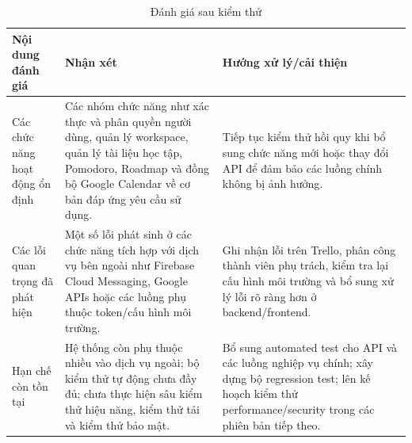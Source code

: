 \begin{table}[H]
\centering
\caption{Đánh giá sau kiểm thử}
\label{tab:post-test-evaluation}
\small
\begin{tabular}{|L{0.16\textwidth}|L{0.40\textwidth}|L{0.32\textwidth}|}
\hline
\textbf{Nội dung đánh giá} & \textbf{Nhận xét} & \textbf{Hướng xử lý/cải thiện} \\
\hline
Các chức năng hoạt động ổn định & Các nhóm chức năng như xác thực và phân quyền người dùng, quản lý workspace, quản lý tài liệu học tập, Pomodoro, Roadmap và đồng bộ Google Calendar về cơ bản đáp ứng yêu cầu sử dụng. & Tiếp tục kiểm thử hồi quy khi bổ sung chức năng mới hoặc thay đổi API để đảm bảo các luồng chính không bị ảnh hưởng. \\
\hline
Các lỗi quan trọng đã phát hiện & Một số lỗi phát sinh ở các chức năng tích hợp với dịch vụ bên ngoài như Firebase Cloud Messaging, Google APIs hoặc các luồng phụ thuộc token/cấu hình môi trường. & Ghi nhận lỗi trên Trello, phân công thành viên phụ trách, kiểm tra lại cấu hình môi trường và bổ sung xử lý lỗi rõ ràng hơn ở backend/frontend. \\
\hline
Hạn chế còn tồn tại & Hệ thống còn phụ thuộc nhiều vào dịch vụ ngoài; bộ kiểm thử tự động chưa đầy đủ; chưa thực hiện sâu kiểm thử hiệu năng, kiểm thử tải và kiểm thử bảo mật. & Bổ sung automated test cho API và các luồng nghiệp vụ chính; xây dựng bộ regression test; lên kế hoạch kiểm thử performance/security trong các phiên bản tiếp theo. \\
\hline
\end{tabular}
\end{table}